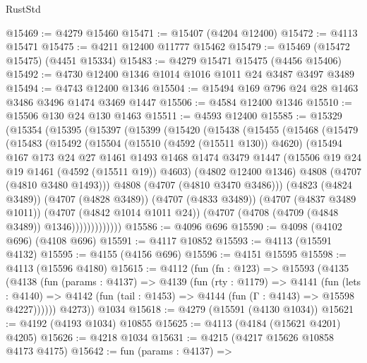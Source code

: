 \begin{lexlean}{RustStd}
\begin{coremodule}
@15469 := @4279 @15460
@15471 := @15407 (@4204 @12400)
@15472 := @4113 @15471
@15475 := @4211 @12400 @11777 @15462
@15479 := @15469 (@15472 @15475) (@4451 @15334)
@15483 := @4279 @15471 @15475 (@4456 @15406)
@15492 := @4730 @12400 @1346 @1014 @1016 @1011 @24 @3487 @3497 @3489
@15494 := @4743 @12400 @1346
@15504 := @15494 @169 @796 @24 @28 @1463 @3486 @3496 @1474 @3469 @1447
@15506 := @4584 @12400 @1346
@15510 := @15506 @130 @24 @130 @1463
@15511 := @4593 @12400
@15585 := @15329
    (@15354
      (@15395
        (@15397
          (@15399
            (@15420
              (@15438
                (@15455
                  (@15468
                    (@15479
                      (@15483
                        (@15492
                          (@15504
                            (@15510 (@4592 (@15511 @130)) @4620)
                            (@15494
                              @167
                              @173
                              @24
                              @27
                              @1461
                              @1493
                              @1468
                              @1474
                              @3479
                              @1447
                              (@15506 @19 @24 @19 @1461 (@4592 (@15511 @19)) @4603)
                              (@4802 @12400 @1346)
                              @4808
                              (@4707 (@4810 @3480 @1493)))
                            @4808
                            (@4707 (@4810 @3470 @3486)))
                          (@4823 (@4824 @3489))
                          (@4707 (@4828 @3489))
                          (@4707 (@4833 @3489))
                          (@4707 (@4837 @3489 @1011))
                          (@4707 (@4842 @1014 @1011 @24))
                          (@4707 (@4708 (@4709 (@4848 @3489)) @1346)))))))))))))
@15586 := @4096 @696
@15590 := @4098 (@4102 @696) (@4108 @696)
@15591 := @4117 @10852
@15593 := @4113 (@15591 @4132)
@15595 := @4155 (@4156 @696)
@15596 := @4151 @15595
@15598 := @4113 (@15596 @4180)
@15615 := @4112
    (fun (fn : @123) =>
    @15593
      (@4135
        (@4138
          (fun (params : @4137) =>
          @4139
            (fun (rty : @1179) =>
            @4141
              (fun (lets : @4140) =>
              @4142 (fun (tail : @1453) => @4144 (fun (Γ : @4143) => @15598 @4227))))))
        @4273))
    @1034
@15618 := @4279 (@15591 (@4130 @1034))
@15621 := @4192 (@4193 @1034) @10855
@15625 := @4113 (@4184 (@15621 @4201) @4205)
@15626 := @4218 @1034
@15631 := @4215 (@4217 @15626 @10858 @4173 @4175)
@15642 := fun (params : @4137) =>

\end{coremodule}
\end{lexlean}
